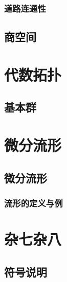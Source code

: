 \documentclass[lang=cn,10pt,device=pad]{elegantbook}
\begin{document}
\section{道路连通性}


\chapter{商空间}

\part{代数拓扑}
\chapter{基本群}

\part{微分流形}
\chapter{微分流形}

\section{流形的定义与例}

\part{杂七杂八}
\chapter{符号说明}
%	
\end{document}
